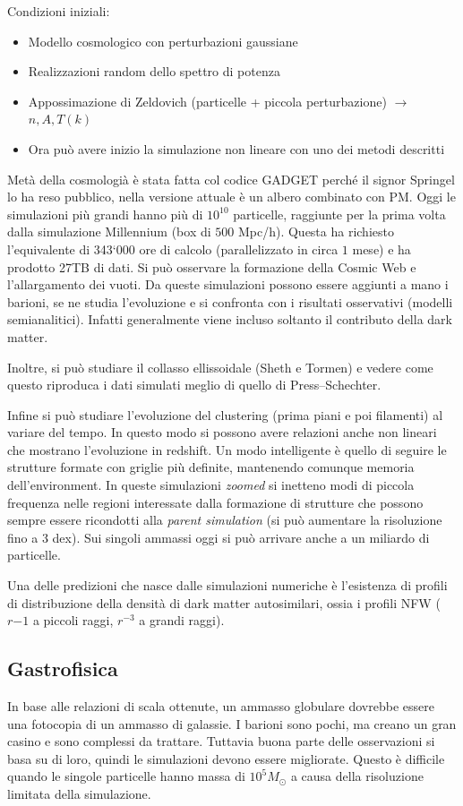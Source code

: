 \noindent Condizioni iniziali:
\begin{itemize}
    \item Modello cosmologico con perturbazioni gaussiane
    \item Realizzazioni random dello spettro di potenza 
    \item Appossimazione di Zeldovich (particelle + piccola perturbazione) $\to$ $n,A,T(k)$
    \item Ora può avere inizio la simulazione non lineare con uno dei metodi descritti
\end{itemize}

Metà della cosmologià è stata fatta col codice GADGET perché il signor Springel lo ha reso pubblico, nella versione attuale è un albero combinato con PM. Oggi le simulazioni più grandi hanno più di $10^{10}$ particelle, raggiunte per la prima volta dalla simulazione Millennium (box di $500$ Mpc/h). Questa ha richiesto l'equivalente di 343`000 ore di calcolo (parallelizzato in circa $1$ mese) e ha prodotto 27TB di dati. Si può osservare la formazione della Cosmic Web e l'allargamento dei vuoti. Da queste simulazioni possono essere aggiunti a mano i barioni, se ne studia l'evoluzione e si confronta con i risultati osservativi (modelli semianalitici). Infatti generalmente viene incluso soltanto il contributo della dark matter.

Inoltre, si può studiare il collasso ellissoidale (Sheth e Tormen) e vedere come questo riproduca i dati simulati meglio di quello di Press–Schechter.

Infine si può studiare l'evoluzione del clustering (prima piani e poi filamenti) al variare del tempo. In questo modo si possono avere relazioni anche non lineari che mostrano l'evoluzione in redshift. Un modo intelligente è quello di seguire le strutture formate con griglie più definite, mantenendo comunque memoria dell'environment. In queste simulazioni \textit{zoomed} si inetteno modi di piccola frequenza nelle regioni interessate dalla formazione di strutture che possono sempre essere ricondotti alla \textit{parent simulation} (si può aumentare la risoluzione fino a 3 dex). Sui singoli ammassi oggi si può arrivare anche a un miliardo di particelle.

Una delle predizioni che nasce dalle simulazioni numeriche è l'esistenza di profili di distribuzione della densità di dark matter autosimilari, ossia i profili NFW ($r{-1}$ a piccoli raggi, $r^{-3}$ a grandi raggi). 

\subsection{Gastrofisica}
In base alle relazioni di scala ottenute, un ammasso globulare dovrebbe essere una fotocopia di un ammasso di galassie. I barioni sono pochi, ma creano un gran casino e sono complessi da trattare. Tuttavia buona parte delle osservazioni si basa su di loro, quindi le simulazioni devono essere migliorate. Questo è difficile quando le singole particelle hanno massa di $10^5 M_\odot$ a causa della risoluzione limitata della simulazione.

